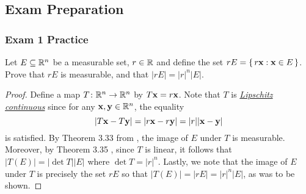 \subsection{Exam Preparation}
\setcounter{exercise}{0}

\subsubsection{Exam 1 Practice}
\begin{problem}
Let $E\subseteq\mathbb{R}^n$ be a measurable set, $r\in\mathbb{R}$ and define the set
$rE=\left\{\,r\mathbf{x}:\mathbf{x}\in E\,\right\}$. Prove that $rE$ is
measurable, and that $|rE|=|r|^n|E|$.
\end{problem}
\begin{proof}
Define a map $T\colon\mathbb{R}^n\to\mathbb{R}^n$ by $T\mathbf{x}= r\mathbf{x}$. Note
that $T$ is
\href{https://en.wikipedia.org/wiki/Lipschitz_continuity}{\emph{Lipschitz
    continuous}} since for any $\mathbf{x},\mathbf{y}\in\mathbb{R}^n$, the equality
\begin{equation}
\label{eq:prep:1:1}
|T\mathbf{x}-T\mathbf{y}|=|r\mathbf{x}-r\mathbf{y}|=|r||\mathbf{x}-\mathbf{y}|
\end{equation}
is satisfied. By Theorem 3.33 from \cite[Ch.\@ 3, p.\@55]{wheeden-zygmund},
the image of $E$ under $T$ is measurable. Moreover, by Theorem 3.35
\cite[Ch.\@ 3, p.\@ 56]{wheeden-zygmund}, since $T$ is linear, it follows
that $|T(E)|=|{\det T}||E|$ where $\det T=|r|^n$. Lastly, we note that the
image of $E$ under $T$ is precisely the set $rE$ so that
$|T(E)|=|rE|=|r|^n|E|$, as was to be shown.
\end{proof}

